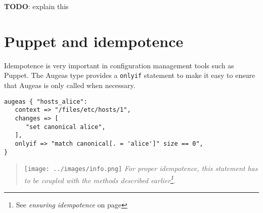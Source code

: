 \textbf{TODO}: explain this

\section{Puppet and idempotence}

Idempotence is very important in configuration management tools such as Puppet. The Augeas type provides a \verb!onlyif! statement to make it easy to ensure that Augeas is only called when necessary.

\begin{verbatim}
augeas { "hosts_alice":
   context => "/files/etc/hosts/1",
   changes => [
      "set canonical alice",
   ],
   onlyif => "match canonical[. = 'alice']" size == 0",
}
\end{verbatim}
\begin{quote}
\texttt{[image: ../images/info.png]} \emph{For proper idempotence, this statement has to be coupled with the methods described earlier\footnote{See \emph{ensuring idempotence} on page \pageref{sec:ensuring_idempotence}}.}

\end{quote}
